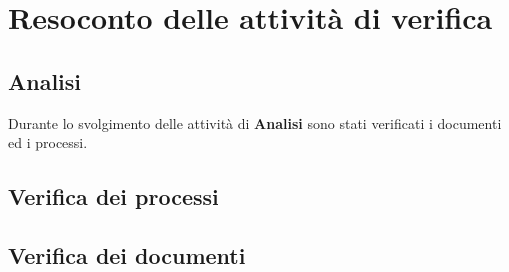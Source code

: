\chapter{Resoconto delle attività di verifica}
\section{Analisi}
Durante lo svolgimento delle attività di \textbf{Analisi} sono stati verificati i documenti ed i processi.\\

\section{Verifica dei processi}

\section{Verifica dei documenti}
